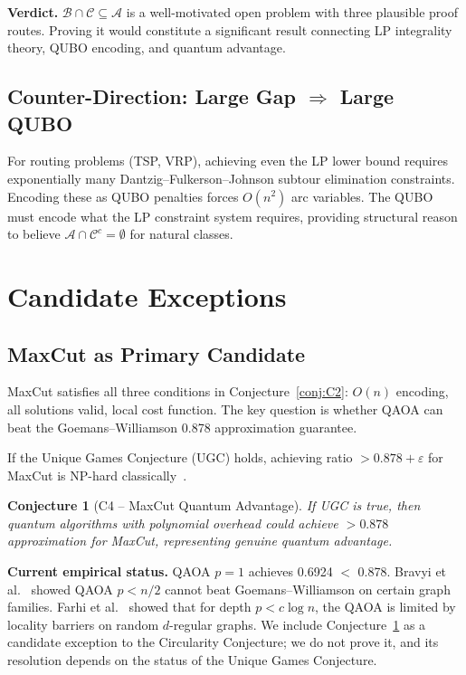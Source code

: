 \documentclass[11pt]{article}
\newtheorem{conjecture}[theorem]{Conjecture}
\theoremstyle{remark}
\newcommand{\calA}{\mathcal{A}}
\newcommand{\calB}{\mathcal{B}}
\newcommand{\calC}{\mathcal{C}}
\begin{document}
\noindent\textbf{Verdict.} $\calB \cap \calC \subseteq \calA$ is a
well-motivated open problem with three plausible proof routes. Proving it
would constitute a significant result connecting LP integrality theory, QUBO
encoding, and quantum advantage.

\subsection{Counter-Direction: Large Gap $\Rightarrow$ Large QUBO}

For routing problems (TSP, VRP), achieving even the LP lower bound requires
exponentially many Dantzig--Fulkerson--Johnson subtour elimination
constraints. Encoding these as QUBO penalties forces $O(n^2)$ arc variables.
The QUBO must encode what the LP constraint system requires, providing
structural reason to believe $\calA \cap \calC^c = \emptyset$ for natural
classes.

\section{Candidate Exceptions}
\label{sec:exceptions}

\subsection{MaxCut as Primary Candidate}

MaxCut satisfies all three conditions in Conjecture~\ref{conj:C2}: $O(n)$
encoding, all solutions valid, local cost function. The key question is
whether QAOA can beat the Goemans--Williamson 0.878 approximation guarantee.

If the Unique Games Conjecture (UGC) holds, achieving ratio
$> 0.878 + \varepsilon$ for MaxCut is NP-hard
classically~\cite{khot2007maxcut}.

\begin{conjecture}[C4 -- MaxCut Quantum Advantage]
\label{conj:C4}
If UGC is true, then quantum algorithms with polynomial overhead could achieve
$> 0.878$ approximation for MaxCut, representing genuine quantum advantage.
\end{conjecture}

\noindent\textbf{Current empirical status.} QAOA $p=1$ achieves 0.6924
$<$ 0.878. Bravyi et al.~\cite{bravyi2020obstacles} showed QAOA $p < n/2$
cannot beat Goemans--Williamson on certain graph families.
Farhi et al.~\cite{farhi2020typical,farhi2020worst} showed that for depth
$p < c \log n$, the QAOA is limited by locality barriers on random
$d$-regular graphs. We include Conjecture~\ref{conj:C4} as a candidate exception to the Circularity Conjecture; we do not prove it, and its resolution depends on the status of the Unique Games Conjecture.
\end{document}
